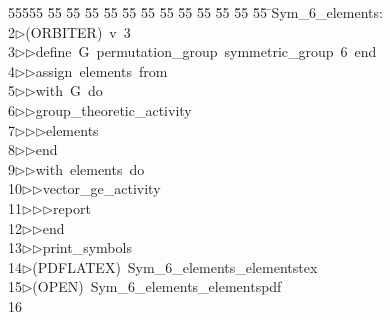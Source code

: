 %
%
\begin{tabbing}
55555 \= 55 \= 55 \= 55 \= 55 \= 55 \= 55 \= 55 \= 55 \= 55 \= 55 \= 55 \= 55 \= \>Sym\_6\_elements:\\[0pt]
2\>$\triangleright$\>(ORBITER)\ v\ 3\ \\[0pt]
3\>$\triangleright$\>$\triangleright$\>define\ G\ permutation\_group\ symmetric\_group\ 6\ end\ \\[0pt]
4\>$\triangleright$\>$\triangleright$\>assign\ elements\ from\ \\[0pt]
5\>$\triangleright$\>$\triangleright$\>with\ G\ do\ \\[0pt]
6\>$\triangleright$\>$\triangleright$\>group\_theoretic\_activity\ \\[0pt]
7\>$\triangleright$\>$\triangleright$\>$\triangleright$\>elements\ \\[0pt]
8\>$\triangleright$\>$\triangleright$\>end\ \\[0pt]
9\>$\triangleright$\>$\triangleright$\>with\ elements\ do\ \\[0pt]
10\>$\triangleright$\>$\triangleright$\>vector\_ge\_activity\ \\[0pt]
11\>$\triangleright$\>$\triangleright$\>$\triangleright$\>report\ \\[0pt]
12\>$\triangleright$\>$\triangleright$\>end\ \\[0pt]
13\>$\triangleright$\>$\triangleright$\>print\_symbols\\[0pt]
14\>$\triangleright$\>(PDFLATEX)\ Sym\_6\_elements\_elementstex\\[0pt]
15\>$\triangleright$\>(OPEN)\ Sym\_6\_elements\_elementspdf\\[0pt]
16\>\end{tabbing}
